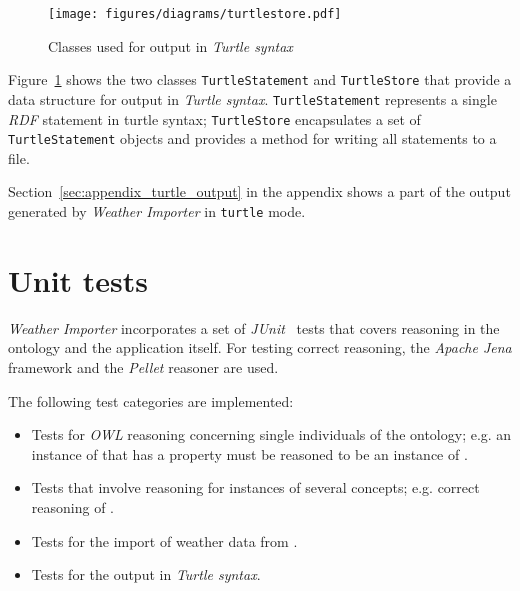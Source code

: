 \begin{figure}
\centering
\texttt{[image: figures/diagrams/turtlestore.pdf]}
\caption{Classes used for output in \emph{Turtle syntax}}
\label{fig:importer_turtlestore}
\end{figure}

Figure~\ref{fig:importer_turtlestore} shows the two classes \texttt{TurtleStatement} and \texttt{TurtleStore} that provide a data structure for output in \emph{Turtle syntax}. \texttt{TurtleStatement} represents a single \emph{RDF} statement in turtle syntax; \texttt{TurtleStore} encapsulates a set of \texttt{TurtleStatement} objects and provides a method for writing all statements to a file.

Section~\ref{sec:appendix_turtle_output} in the appendix shows a part of the output generated by \emph{Weather Importer} in \texttt{turtle} mode.

\section{Unit tests}
\label{sec:importer_tests}

\emph{Weather Importer} incorporates a set of \emph{JUnit}~\cite{junit} tests that covers reasoning in the \thinkhomeweather ontology and the application itself. For testing correct reasoning, the \emph{Apache Jena} framework and the \emph{Pellet} reasoner are used.

The following test categories are implemented:
\begin{itemize}
  \item Tests for \emph{OWL} reasoning concerning single individuals of the ontology; e.g. an instance of  that has a  property must be reasoned to be an instance of .
  \item Tests that involve reasoning for instances of several concepts; e.g. correct reasoning of .
  \item Tests for the import of weather data from \yrno.
  \item Tests for the output in \emph{Turtle syntax}.
\end{itemize}

\begin{comment}
The following parts of the application are not covered by unit tests:

\begin{itemize}
  \item bla
  \item blubb
  \item foo
  \item bar
\end{itemize}
\end{comment}
